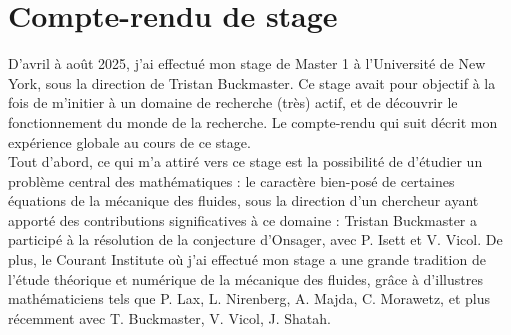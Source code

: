 \documentclass[11pt,a4paper]{article}
\begin{document}
{\centering
\section*{Compte-rendu de stage}
}
\hspace*{2em} D'avril à août 2025, j'ai effectué mon stage de Master 1 à l'Université de New York, sous la direction de Tristan Buckmaster. Ce stage avait pour objectif à la fois de m'initier à un domaine de recherche (très) actif, et de découvrir le fonctionnement du monde de la recherche. Le compte-rendu qui suit décrit mon expérience globale au cours de ce stage. \\

\hspace*{2em} Tout d'abord, ce qui m'a attiré vers ce stage est la possibilité de d'étudier un problème central des mathématiques : le caractère bien-posé de certaines équations de la mécanique des fluides, sous la direction d'un chercheur ayant apporté des contributions significatives à ce domaine : Tristan Buckmaster a participé à la résolution de la conjecture d'Onsager, avec P. Isett et V. Vicol. De plus, le Courant Institute où j'ai effectué mon stage a une grande tradition de l'étude théorique et numérique de la mécanique des fluides, grâce à d'illustres mathématiciens  tels que P. Lax, L. Nirenberg, A. Majda, C. Morawetz, et plus récemment avec T. Buckmaster, V. Vicol, J. Shatah. \\
\end{document}
